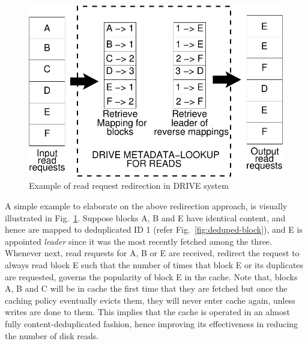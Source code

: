 \begin{figure}[t]
    \centering
    \includegraphics[scale=0.6]{confided-figures/main/dedup-working-reads.pdf}
    \caption{Example of read request redirection in DRIVE system}
    \label{fig:confided-working(a)}
\end{figure}

A simple example to elaborate on the above redirection approach, is visually
illustrated in Fig.~\ref{fig:confided-working(a)}.
Suppose blocks A, B and E have identical content, and hence 
are mapped to deduplicated ID 1
(refer Fig.~\ref{fig:deduped-block}),
and E is appointed \textit{leader} since it was the most recently fetched
among the three.
Whenever next, read requests for A, B or E are received, redirect the request
to always read block E such that the number of times that block E or its
duplicates are requested, governs the popularity of block E in the cache.
Note that, blocks A, B and C will be in cache the first time that they 
are fetched but once the caching policy eventually evicts them, they
will never enter cache again, unless writes are done to them. This implies
that the cache is operated in an almost fully content-deduplicated fashion,
hence improving its effectiveness in reducing the number of disk reads.


